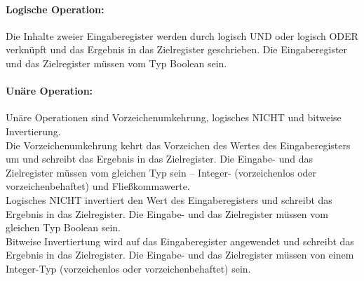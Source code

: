 \documentclass[twoside,a4paper,fleqn,12pt]{book}
\begin{document}


\paragraph{Logische Operation:} Die Inhalte zweier Eingaberegister werden durch logisch UND oder logisch ODER verknüpft und das Ergebnis in das Zielregister geschrieben.
Die Eingaberegister und das Zielregister müssen vom Typ Boolean sein.



\paragraph{Unäre Operation:} Unäre Operationen sind Vorzeichenumkehrung, logisches NICHT und bitweise Invertierung.\\
Die Vorzeichenumkehrung kehrt das Vorzeichen des Wertes des Eingaberegisters um und schreibt das Ergebnis in das Zielregister.
Die Eingabe- und das Zielregister müssen vom gleichen Typ sein -- Integer- (vorzeichenlos oder vorzeichenbehaftet) und Fließkommawerte.\\
Logisches NICHT invertiert den Wert des Eingaberegisters und schreibt das Ergebnis in das Zielregister.
Die Eingabe- und das Zielregister müssen vom gleichen Typ Boolean sein.\\
Bitweise Invertiertung wird auf das Eingaberegister angewendet und schreibt das Ergebnis in das Zielregister.
Die Eingabe- und das Zielregister müssen von einem Integer-Typ (vorzeichenlos oder vorzeichenbehaftet) sein.

\end{document}
